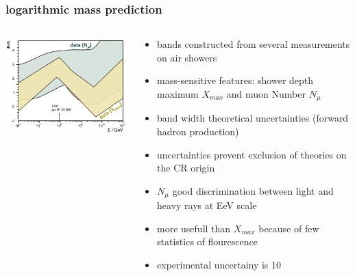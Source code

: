 \documentclass[aspectratio=1610, 9pt]{beamer}
\begin{document}
\begin{frame}\frametitle{logarithmic mass prediction}
  \begin{columns}
    \begin{column}[c]{0.48\textwidth}
      \includegraphics{lnA_right.png}
    \end{column}
    \begin{column}[c]{0.48\textwidth}
      \begin{itemize}
        \item bands constructed from several measurements on air showers
        \item mass-sensitive features: shower depth maximum $X_{max}$ and muon Number $N_{\mu}$
        \item band width \to theoretical uncertainties (forward hadron production)
        \item uncertainties prevent exclusion of theories on the CR origin
        \item $N_{\mu}$ good discrimination between light and heavy rays at EeV scale
        \item more usefull than $X_{max}$ because of few statistics of flourescence
        \item experimental uncertainy is 10\percent
      \end{itemize}
    \end{column}
  \end{columns}
\end{frame}
\end{document}
